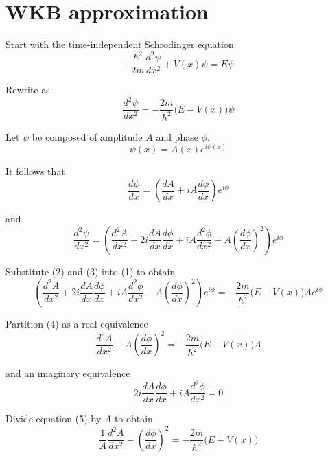

\section*{WKB approximation}

Start with the time-independent Schrodinger equation
\begin{equation*}
-\frac{\hbar^2}{2m}\frac{d^2\psi}{dx^2}+V(x)\psi=E\psi
\end{equation*}

Rewrite as
\begin{equation*}
\frac{d^2\psi}{dx^2}=-\frac{2m}{\hbar^2}\bigl(E-V(x)\bigr)\psi
\tag{1}
\end{equation*}

Let $\psi$ be composed of amplitude $A$ and phase $\phi$.
\begin{equation*}
\psi(x)=A(x)e^{i\phi(x)}
\tag{2}
\end{equation*}

It follows that
\begin{equation*}
\frac{d\psi}{dx}=\left(\frac{dA}{dx}+iA\frac{d\phi}{dx}\right)e^{i\phi}
\end{equation*}

and
\begin{equation*}
\frac{d^2\psi}{dx^2}=\left(
\frac{d^2A}{dx^2}+2i\frac{dA}{dx}\frac{d\phi}{dx}
+iA\frac{d^2\phi}{dx^2}-A\left(\frac{d\phi}{dx}\right)^2
\right)e^{i\phi}
\tag{3}
\end{equation*}

Substitute (2) and (3) into (1) to obtain
\begin{equation*}
\left(
\frac{d^2A}{dx^2}+2i\frac{dA}{dx}\frac{d\phi}{dx}
+iA\frac{d^2\phi}{dx^2}-A\left(\frac{d\phi}{dx}\right)^2
\right)e^{i\phi}
=-\frac{2m}{\hbar^2}\bigl(E-V(x)\bigr)Ae^{i\phi}
\tag{4}
\end{equation*}

Partition (4) as a real equivalence
\begin{equation*}
\frac{d^2A}{dx^2}-A\left(\frac{d\phi}{dx}\right)^2
=-\frac{2m}{\hbar^2}\bigl(E-V(x)\bigr)A
\tag{5}
\end{equation*}

and an imaginary equivalence
\begin{equation*}
2i\frac{dA}{dx}\frac{d\phi}{dx}+iA\frac{d^2\phi}{dx^2}=0
\tag{6}
\end{equation*}

Divide equation (5) by $A$ to obtain
\begin{equation*}
\frac{1}{A}\frac{d^2A}{dx^2}-\left(\frac{d\phi}{dx}\right)^2
=-\frac{2m}{\hbar^2}\bigl(E-V(x)\bigr)
\end{equation*}

